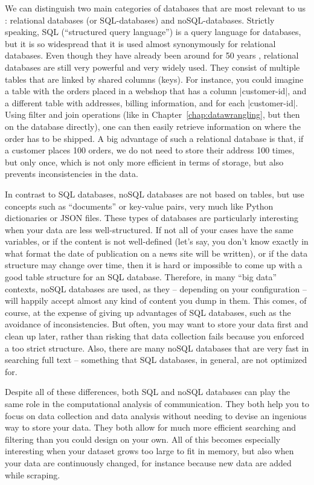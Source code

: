 We can distinguish two main categories of databases
that are most relevant to us \citep[see also][]{Gunther2018}:
relational databases (or SQL-databases) and noSQL-databases. Strictly
speaking, SQL (``structured query language'') is a query language for
databases, but it is so widespread that it is used almost synonymously
for relational databases. Even though they have already been around for
 50 years \citep{Codd1970}, relational databases are still  very
powerful and very widely used.  They consist of multiple tables that
are linked by shared columns (keys). For instance, you could imagine a
table with the orders placed in a webshop that has a column
|customer-id|, and a different table with addresses, billing
information, and for each |customer-id|. Using filter and join
operations (like in Chapter~\ref{chap:datawrangling}, but then on the database directly), one can then easily retrieve
information on where the order has to be shipped. A big advantage of
such a relational database is that, if a customer places 100 orders,
we do not need to store their address 100 times, but only once, which
is not only more efficient in terms of storage, but also prevents
inconsistencies in the data.

In contrast to SQL databases, noSQL databases are not based on tables,
but use concepts such as ``documents'' or key-value pairs, very much
like Python dictionaries or JSON files. These types of databases are
particularly interesting when your data are less well-structured. If
not all of your cases have the same variables, or if the content is not
well-defined (let's say, you don't know exactly in what format the date
of publication on a news site will be written), or if the data structure
may change over time, then it is hard or impossible to come up with a
good table structure for an SQL database. Therefore, in many ``big data''
contexts, noSQL databases are used, as they -- depending on your
configuration -- will happily accept almost any kind of content you dump
in them. This comes, of course, at the expense of giving up advantages
of SQL databases, such as the avoidance of inconsistencies. But often,
you may  want to store your data first and clean up later, rather
than risking that data collection fails because you enforced a too strict
structure. Also, there are many noSQL databases that are very fast in
searching full text -- something that SQL databases, in general, are
not optimized for.

Despite all of these differences, both SQL and noSQL databases can play
the same role in the computational analysis of communication. They both
help you to focus on data collection and data analysis without needing
to devise an ingenious way to store your data. They both allow for much
more efficient searching and filtering than you could design on your own.
All of this becomes especially interesting when your dataset grows too
large to fit in memory, but also when your data are continuously changed,
for instance because new data are added while scraping.


